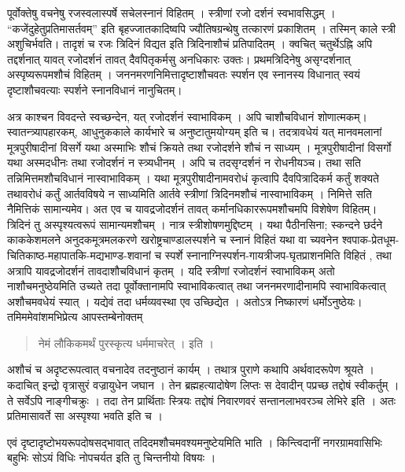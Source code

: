 {पूर्वोक्तेषु वचनेषु रजस्वलास्पर्षे सचेलस्नानं विहितम् । स्त्रीणां रजो दर्शनं स्वभावसिद्धम् । “कजेंदुहेतुप्रतिमासर्तवम्” इति बृहज्जातकादिष्वपि ज्यौतिषग्रन्थेषु तत्कारणं प्रकाशितम् । तस्मिन् काले स्त्री अशुचिर्भवति। तादृशं च रजः त्रिदिनं विद्यत इति त्रिदिनाशौचं प्रतिपादितम् । क्वचित् चतुर्थेऽह्नि अपि तद्दर्शनात् यावत् रजोदर्शनं तावत् दैवपितृकर्मसु अनधिकारः उक्तः। प्रथमत्रिदिनेषु असृग्दर्शनात् अस्पृष्यरूपमशौचं विहितम् । जननमरणनिमित्तादृष्टाशौचवतः स्पर्शन एव स्नानस्य विधानात् स्वयं दृष्टाशौचवत्याः स्पर्शने स्नानविधानं नानुचितम्।

अत्र काश्चन विवदन्ते स्वच्छन्देन, यत् रजोदर्शनं स्वाभाविकम् । अपि चाशौचविधानं शोणात्मकम्। स्वातन्त्र्यापहारकम्, आधुनुककाले कार्यभारे च अनुष्टातुमयोग्यम् इति च। तदत्रावधेयं यत् मानवमलानां मूत्रपुरीषादीनां विसर्गे यथा अस्माभिः शौचं क्रियते तथा रजोदर्शने शौचं न साध्यम् । मूत्रपुरीषादीनां विसर्गो यथा अस्मदधीनः तथा रजोदर्शनं न स्त्र्यधीनम् । अपि च तदसृग्दर्शनं न रोधनीयञ्च। तथा सति तन्निमित्तमशौचविधानं नास्वाभाविकम् । यथा मूत्रपुरीषादीनामवरोधं कृत्वापि दैवपित्रादिकर्म कर्तुं शक्यते तथावरोधं कर्तुं आर्तवविषये न साध्यमिति आर्तवे स्त्रीणां त्रिदिनमशौचं नास्वाभाविकम् । निमित्ते सति नैमित्तिकं सामान्यमेव। अत एव च यावद्रजोदर्शनं तावत् कर्मानधिकाररूपमशौचमपि विशेषेण विहितम्। त्रिदिनं तु अस्पृश्यत्वरूपं सामान्यमशौचम् । नात्र स्त्रीशोषणमुद्दिष्टम् । यथा पैठीनसिना; स्कन्दने छर्दने काककेशमलने अनुदकमूत्रमलकरणे खरोष्ट्रचाण्डालस्पर्शने च स्नानं विहितं यथा वा च्यवनेन श्वपाक-प्रेतधूम-चितिकाष्ठ-महापातकि-मद्यभाण्ड-शवानां च स्पर्शे स्नानाग्निस्पर्शन-गायत्रीजप-घृतप्राशनमिति विहितं , तथा अत्रापि यावद्रजोदर्शनं तावदाशौचविधानं कृतम् । यदि स्त्रीणां रजोदर्शनं स्वाभाविकम् अतो नाशौचमनुष्ठेयमिति उच्यते तदा पूर्वोक्तानामपि स्वाभाविकत्वात् तथा जननमरणादीनामपि स्वाभाविकत्वात् अशौचमवधेयं स्यात् । यद्येवं तदा धर्मव्यवस्था एव उच्छिद्येत । अतोऽत्र निष्कारणं धर्मोऽनुष्ठेयः। तमिममेवांशमभिप्रेत्य आपस्तम्बेनोक्तम् 

\begin{verse}
नेमं लौकिकमर्थं पुरस्कृत्य धर्ममाचरेत् । इति । 
\end{verse}
अशौचं च अदृष्टरूपत्वात् वचनादेव तदनुष्ठानं कार्यम् । तथात्र पुराणे कथापि अर्थवादरूपेण श्रूयते । कदाचित् इन्द्रो वृत्रासुरं वज्रायुधेन जघान । तेन ब्रह्महत्यादोषेण लिप्तः स देवादीन् पप्रच्छ तद्दोषं स्वीकर्तुम् । ते सर्वेऽपि नाङ्गीचक्रुः । तदा तेन प्रार्थिताः स्त्रियः तद्दोषं निवारणवरं सन्तानलाभवरञ्च लेभिरे इति । अतः प्रतिमासावर्ते सा अस्पृश्या भवति इति च । 

एवं दृष्टादृष्टोभयरूपदोषसद्भावात् तदिदमशौचमवश्यमनुष्टेयमिति भाति । किन्त्विदानीं नगरग्रामवासिभिः बहुभिः सोऽयं विधिः नोपचर्यत इति तु चिन्तनीयो विषयः ।

}
